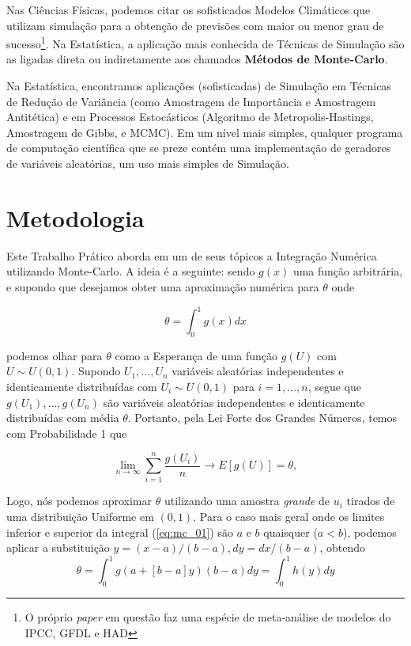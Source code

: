 \documentclass[
	article,			%
	12pt,				%
	twoside,			%
	a4paper,			%
	english,			%
	brazil,				%
	]{abntex2}
\begin{document}
    Nas Ciências Físicas, podemos citar os sofisticados Modelos Climáticos \cite{ramirez2007desempenho} que utilizam simulação para a obtenção de previsões com maior ou menor grau de sucesso\footnote{O próprio \textit{paper} em questão faz uma espécie de meta-análise de modelos do IPCC, GFDL e HAD}. Na Estatística, a aplicação mais conhecida de Técnicas de Simulação são as ligadas direta ou indiretamente aos chamados \textbf{Métodos de Monte-Carlo}. 
    
    Na Estatística, encontramos aplicações (sofisticadas) de Simulação em Técnicas de Redução de Variância (como Amostragem de Importância e Amostragem Antitética) e em Processos Estocásticos (Algoritmo de Metropolis-Hastings, Amostragem de Gibbs, e MCMC). Em um nível mais simples, qualquer programa de computação científica que se preze contém uma implementação de geradores de variáveis aleatórias, um uso mais simples de Simulação.
    
    
\section{Metodologia}

    Este Trabalho Prático aborda em um de seus tópicos a Integração Numérica utilizando Monte-Carlo. A ideia é a seguinte: sendo $g(x)$ uma função arbitrária, e supondo que desejamos obter uma aproximação numérica para $\theta$ onde 
    
    \begin{equation}\label{eq:mc_01}
      \theta = \int_0^1g(x)dx  
    \end{equation}
    
    
    podemos olhar para $\theta$ como a Esperança de uma função $g(U)$ com $U \sim U(0,1)$. Supondo $U_1,\dots,U_n$ variáveis aleatórias independentes e identicamente distribuídas com $U_i \sim U(0,1)$ para $i = 1,\dots,n$, segue que $g(U_1),\dots,g(U_n)$ são variáveis aleatórias independentes e identicamente distribuídas com média $\theta$. Portanto, pela Lei Forte dos Grandes Números, temos com Probabilidade 1 que 
    
    \begin{equation}\label{eq:LFGN_MC}
        \lim_{n \rightarrow \infty}\sum_{i=1}^n\frac{g(U_i)}{n} \rightarrow E[g(U)] = \theta, 
    \end{equation}
    
    Logo, nós podemos aproximar $\theta$ utilizando uma amostra \textit{grande} de $u_i$ tirados de uma distribuição Uniforme em $(0,1)$. Para o caso mais geral onde os limites inferior e superior da integral (\ref{eq:mc_01}) são $a$ e $b$ quaisquer ($a<b$), podemos aplicar a substituição $y = (x-a)/(b-a), dy = dx/(b-a)$, obtendo 
    \begin{equation}\label{eq:MCI_arb}
        \theta = \int_0^1g(a+[b-a]y)(b-a)dy = \int_0^1h(y)dy
    \end{equation}
    
\end{document}
